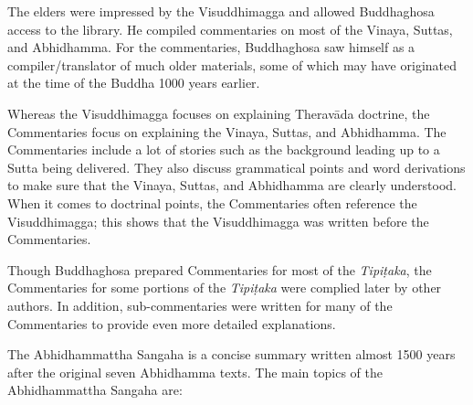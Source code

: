The elders were impressed by the Visuddhimagga and allowed Buddhaghosa access to the library. He compiled commentaries on most of the Vinaya, Suttas, and Abhidhamma. For the commentaries, Buddhaghosa saw himself as a compiler/translator of much older materials, some of which may have originated at the time of the Buddha 1000 years earlier.

Whereas the Visuddhimagga focuses on explaining Theravāda doctrine, the Commentaries focus on explaining the Vinaya, Suttas, and Abhidhamma. The Commentaries include a lot of stories such as the background leading up to a Sutta being delivered. They also discuss grammatical points and word derivations to make sure that the Vinaya, Suttas, and Abhidhamma are clearly understood. When it comes to doctrinal points, the Commentaries often reference the Visuddhimagga; this shows that the Visuddhimagga was written before the Commentaries. 

Though Buddhaghosa prepared Commentaries for most of the \textit{Tipiṭaka}, the Commentaries for some portions of the \textit{Tipiṭaka} were complied later by other authors. In addition, sub-commentaries were written for many of the Commentaries to provide even more detailed explanations.

\pagebreak


The Abhidhammattha Sangaha is a concise summary written almost 1500 years after the original seven Abhidhamma texts. The main topics of the Abhidhammattha Sangaha are:


